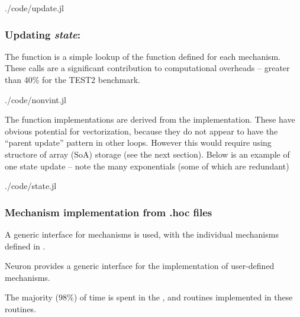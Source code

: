 
\begin{shaded}
 {./code/update.jl}
\end{shaded}
\subsubsection{Updating \emph{state}: }
The  function is a simple lookup of the  function defined for each mechanism. These calls are a significant contribution to computational overheads -- greater than 40\% for the TEST2 benchmark.

\begin{shaded}
 {./code/nonvint.jl}
\end{shaded}

The  function implementations are derived from the  implementation. These have obvious potential for vectorization, because they do not appear to have the ``parent update'' pattern in other loops. However this would require using structore of array (SoA) storage (see the next section). Below is an example of one state update -- note the many exponentials (some of which are redundant)

\begin{shaded}
 {./code/state.jl}
\end{shaded}

\subsubsection{Mechanism implementation from .hoc files}
A generic interface for mechanisms is used, with the individual mechanisms defined in .

Neuron provides a generic interface for the implementation of user-defined mechanisms.

The majority (98\%) of time is spent in the ,  and  routines implemented in these routines.



